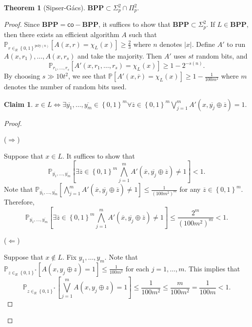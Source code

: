 \documentclass[10pt,letterpaper,cm]{nupset}
\theoremstyle{definition}
\theoremstyle{theorem}
\newtheorem{theorem}[definition]{Theorem}
\newtheorem*{claim}{Claim}
\theoremstyle{remark}
\newcommand{\1}{\mathbf{1}}
\newcommand{\0}{\vec 0}
\begin{document}
\begin{theorem}[Sipser-G\'acs]
$\mathbf{BPP} \subset \Sigma^2_p \cap \Pi^2_p$.
\end{theorem}
\begin{proof}
Since $\mathbf{BPP} = \mathsf{co}{-}\mathbf{BPP}$, it suffices to show that $\mathbf{BPP} \subset \Sigma^2_p$. If $L \in \mathbf{BPP}$, then there exists an efficient algorithm $A$ such that $\mathbb{P}_{r \in_R \left\{0,1\right\}^{\text{poly}(n)}}\left[A(x,r) = \chi_L(x)\right] \geq \frac{2}{3}$ where $n$ denotes $\left\lvert{x}\right\rvert$. Define $A'$ to run $A(x, r_1), \ldots, A(x, r_s)$ and take the majority. Then $A'$ uses $st$ random bits, and $$\mathbb{P}_{r_1, \ldots, r_s}\left[A'(x, r_1, \ldots, r_s) =\chi_L(x)\right] \geq 1 - 2^{{-}s(n)}.$$ By choosing $s \gg 10t^2$, we see that $\mathbb{P}[A'(x, \overline{r}) = \chi_L(x)] \geq 1 -\frac{1}{100m^2}$ where $m$ denotes the number of random bits used. 
\begin{claim}
$x \in L \iff \exists \overline{y_1}, \ldots, \overline{y_m} \in \left\{0,1\right\}^m \forall \overline{z} \in \left\{0,1\right\}^m \bigvee_{j=1}^m A'\left(x, \overline{y_j} \oplus \overline{z}\right)=1$.
\end{claim}
\begin{proof} $ $

($\Longrightarrow$) 

\smallskip

Suppose that $x \in L$. It suffices to show that $$   \mathbb{P}_{\overline{y_1}, \ldots, \overline{y_m}} \left[\exists \overline{z} \in \left\{0,1\right\}^m \bigwedge_{j=1}^m A'\left(\overline{x}, \overline{y_j} \oplus \overline{z}\right) \ne 1 \right] <1   .$$ Note that $\mathbb{P}_{\overline{y_1}, \ldots, \overline{y_m}} \left[\bigwedge_{j=1}^m  A'\left(\overline{x}, \overline{y_j} \oplus \overline{z}\right) \ne 1 \right] \leq \frac{1}{\left(100m^2\right)^m}$ for any $\overline{z} \in \left\{0,1\right\}^m$. Therefore, $$      \mathbb{P}_{\overline{y_1}, \ldots, \overline{y_m}}  \left[\exists \overline{z} \in \left\{0,1\right\}^m \bigwedge_{j=1}^m A'\left(\overline{x}, \overline{y_j} \oplus \overline{z}\right) \ne 1 \right ]   \leq \frac{2^m}{(100m^2)^m} <1.$$

\medskip

($\Longleftarrow$)  

\smallskip

Suppose that $x \notin L$. Fix $y_1, \ldots, y_m$. Note that $\mathbb{P}_{z \in_R \left\{0,1\right\}^{\ast}}[A(x, y_j \oplus z) =1] \leq \frac{1}{100m^2}$ for each $j=1, \ldots, m$. This implies that $$\mathbb{P}_{z \in_R \left\{0,1\right\}^{\ast}}\left[\bigvee_{j=1}^m A(x, y_j \oplus z) =1\right] \leq \frac{1}{100m^2} \leq \frac{m}{100m^2} = \frac{1}{100m} <1.$$
\end{proof}
\end{proof}
\end{document}
